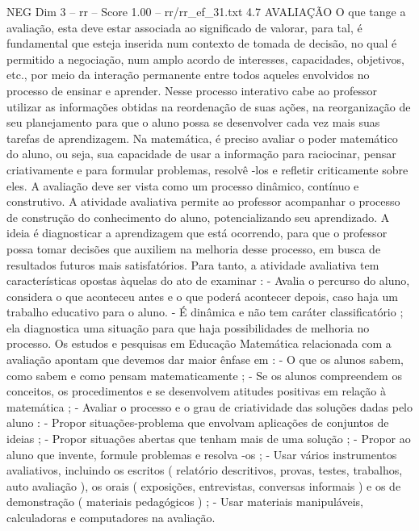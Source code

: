 \begin{textsample}{NEG Dim 3 – rr – Score 1.00 – rr/rr\_ef\_31.txt}  \label{ex:f3_neg_064}
4.7 AVALIAÇÃO O que tange a avaliação, esta deve estar associada ao significado de valorar, para tal, é fundamental que esteja inserida num contexto de tomada de decisão, no qual é permitido a negociação, num amplo acordo de interesses, capacidades, objetivos, etc., por meio da interação permanente entre todos aqueles envolvidos no processo de ensinar e aprender.
Nesse processo interativo cabe ao professor utilizar as informações obtidas na reordenação de suas ações, na reorganização de seu planejamento para que o aluno possa se desenvolver cada vez mais suas tarefas de aprendizagem.
Na matemática, é preciso avaliar o poder matemático do aluno, ou seja, sua capacidade de usar a informação para raciocinar, pensar criativamente e para formular problemas, resolvê -los e refletir criticamente sobre eles.
A avaliação deve ser vista como um processo dinâmico, contínuo e construtivo.
A atividade avaliativa permite ao professor acompanhar o processo de construção do conhecimento do aluno, potencializando seu aprendizado.
A ideia é diagnosticar a aprendizagem que está ocorrendo, para que o professor possa tomar decisões que auxiliem na melhoria desse processo, em busca de resultados futuros mais satisfatórios.
Para tanto, a atividade avaliativa tem características opostas àquelas do ato de examinar : - Avalia o percurso do aluno, considera o que aconteceu antes e o que poderá acontecer depois, caso haja um trabalho educativo para o aluno. - É dinâmica e não tem caráter classificatório ; ela diagnostica uma situação para que haja possibilidades de melhoria no processo.
Os estudos e pesquisas em Educação Matemática relacionada com a avaliação apontam que devemos dar maior ênfase em : - O que os alunos sabem, como sabem e como pensam matematicamente ; - Se os alunos compreendem os conceitos, os procedimentos e se desenvolvem atitudes positivas em relação à matemática ; - Avaliar o processo e o grau de criatividade das soluções dadas pelo aluno : - Propor situações-problema que envolvam aplicações de conjuntos de ideias ; - Propor situações abertas que tenham mais de uma solução ; - Propor ao aluno que invente, formule problemas e resolva -os ; - Usar vários instrumentos avaliativos, incluindo os escritos ( relatório descritivos, provas, testes, trabalhos, auto avaliação ), os orais ( exposições, entrevistas, conversas informais ) e os de demonstração ( materiais pedagógicos ) ; - Usar materiais manipuláveis, calculadoras e computadores na avaliação.

\end{textsample}
